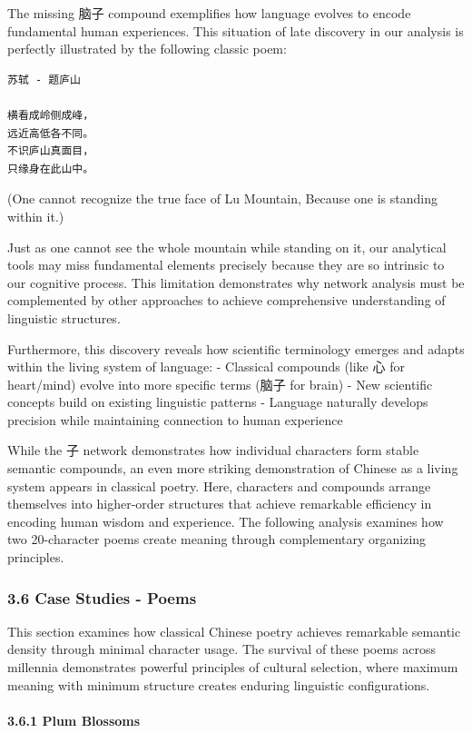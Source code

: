 \documentclass[
]{article}
\begin{document}
The missing 脑子 compound exemplifies how language evolves to encode
fundamental human experiences. This situation of late discovery in our
analysis is perfectly illustrated by the following classic poem:

\begin{verbatim}
苏轼 - 题庐山

横看成岭侧成峰，
远近高低各不同。
不识庐山真面目，
只缘身在此山中。
\end{verbatim}

(One cannot recognize the true face of Lu Mountain, Because one is
standing within it.)

Just as one cannot see the whole mountain while standing on it, our
analytical tools may miss fundamental elements precisely because they
are so intrinsic to our cognitive process. This limitation demonstrates
why network analysis must be complemented by other approaches to achieve
comprehensive understanding of linguistic structures.

Furthermore, this discovery reveals how scientific terminology emerges
and adapts within the living system of language: - Classical compounds
(like 心 for heart/mind) evolve into more specific terms (脑子 for
brain) - New scientific concepts build on existing linguistic patterns -
Language naturally develops precision while maintaining connection to
human experience

While the 子 network demonstrates how individual characters form stable
semantic compounds, an even more striking demonstration of Chinese as a
living system appears in classical poetry. Here, characters and
compounds arrange themselves into higher-order structures that achieve
remarkable efficiency in encoding human wisdom and experience. The
following analysis examines how two 20-character poems create meaning
through complementary organizing principles.

\subsubsection{3.6 Case Studies - Poems}\label{case-studies---poems}

This section examines how classical Chinese poetry achieves remarkable
semantic density through minimal character usage. The survival of these
poems across millennia demonstrates powerful principles of cultural
selection, where maximum meaning with minimum structure creates enduring
linguistic configurations.

\paragraph{3.6.1 Plum Blossoms}\label{plum-blossoms}
\end{document}

